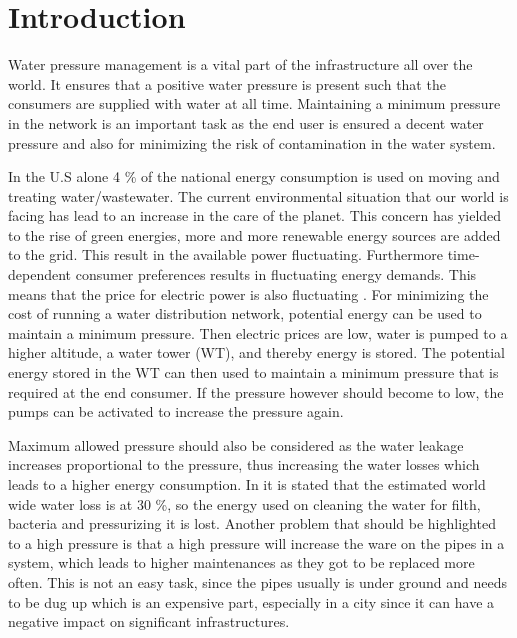 \chapter{Introduction}

Water pressure management is a vital part of the infrastructure all over the world. It ensures that a positive water pressure is present such that the consumers are supplied with water at all time. Maintaining a minimum pressure in the network is an important task as the end user is ensured a decent water pressure and also for minimizing the risk of contamination in the water system\cite{national2005public}.

In the U.S alone 4 \% of the national energy consumption is used on moving and treating water/wastewater\cite{appelbaum2002water}. The current environmental situation that our world is facing has lead to an increase in the care of the planet. This concern has yielded to the rise of green energies, more and more renewable energy sources are added to the grid. This result in the available power fluctuating. Furthermore time-dependent consumer
preferences results in fluctuating energy demands. This means that the price for electric power is also fluctuating \cite{fluctuating_price}. For minimizing the cost of running a water distribution network, potential energy can be used to maintain a minimum pressure. Then electric prices are low, water is pumped to a higher altitude, a water tower (WT), and thereby energy is stored. The potential energy stored in the WT can then used to maintain a minimum pressure that is required at the end consumer. If the pressure however should become to low, the pumps can be activated to increase the pressure again. 

Maximum allowed pressure should also be considered as the water leakage increases proportional to the pressure\cite{feldman2009aspects}, thus increasing the water losses which leads to a higher energy consumption. In \cite{feldman2009aspects} it is stated that the estimated world wide water loss is at 30 \%, so the energy used on cleaning the water for filth, bacteria and pressurizing it is lost. Another problem that should be highlighted to a high pressure is that a high pressure will increase the ware on the pipes in a system\cite{Watts_water}, which leads to higher maintenances as they got to be replaced more often. This is not an easy task, since the pipes usually is under ground and needs to be dug up which is an expensive part, especially in a city since it can have a negative impact on significant infrastructures. 

